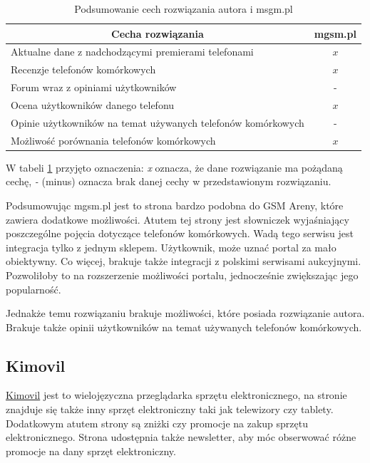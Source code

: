 \begin{table}[H]
    \centering
    \begin{tabular}{|l|c|}
        \hline
        \multicolumn{1}{|c|}{Cecha rozwiązania} & \multicolumn{1}{c|}{mgsm.pl} \\ \hline
        Aktualne dane z nadchodzącymi premierami telefonami & $x$ \\ \hline
        Recenzje telefonów komórkowych & $x$ \\ \hline
        Forum wraz z opiniami użytkowników & - \\ \hline
        Ocena użytkowników danego telefonu & $x$ \\ \hline
        Opinie użytkowników na temat używanych telefonów komórkowych & - \\ \hline
        Możliwość porównania telefonów komórkowych & $x$ \\ \hline
    \end{tabular}
    \caption{Podsumowanie cech rozwiązania autora i msgm.pl}
    \label{comparison_mgsm}
\end{table}
W tabeli \ref*{comparison_mgsm} przyjęto oznaczenia: \textit{x} oznacza, że dane rozwiązanie ma pożądaną cechę, \textit{-} (minus) oznacza brak danej cechy w przedstawionym rozwiązaniu.

Podsumowując mgsm.pl jest to strona bardzo podobna do GSM Areny, które zawiera dodatkowe możliwości. Atutem tej strony jest słowniczek wyjaśniający poszczególne pojęcia dotyczące telefonów komórkowych. Wadą tego serwisu jest integracja tylko z jednym sklepem. Użytkownik, może uznać portal za mało obiektywny. Co więcej, brakuje także integracji z polskimi serwisami aukcyjnymi. Pozwoliłoby to na rozszerzenie możliwości portalu, jednocześnie zwiększając jego popularność.

Jednakże temu rozwiązaniu brakuje możliwości, które posiada rozwiązanie autora. Brakuje także opinii użytkowników na temat używanych telefonów komórkowych. 

\subsection{Kimovil}
\href{https://www.kimovil.com/pl/}{Kimovil} \cite{kimovil} jest to wielojęzyczna przeglądarka sprzętu elektronicznego, na stronie znajduje się także inny sprzęt elektroniczny taki jak telewizory czy tablety. Dodatkowym atutem strony są zniżki czy promocje na zakup sprzętu elektronicznego. Strona udostępnia także newsletter, aby móc obserwować różne promocje na dany sprzęt elektroniczny.

